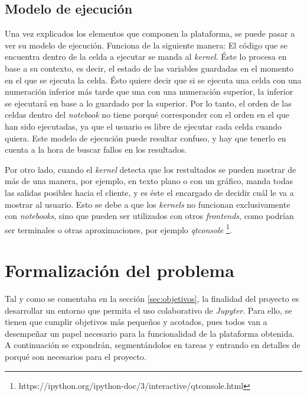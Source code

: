 \documentclass[11pt,spanish,listoffigures]{tfgetsinf}
\begin{document}
\subsection{Modelo de ejecución}
\label{subsec:modelo-ejec}

Una vez explicados los elementos que componen la plataforma, se puede pasar a ver su modelo de ejecución. Funciona de la siguiente manera: El código que se encuentra dentro de la celda a ejecutar se manda al \textit{kernel}. Éste lo procesa en base a su contexto, es decir, el estado de las variables guardadas en el momento en el que se ejecuta la celda. Ésto quiere decir que si se ejecuta una celda con una numeración inferior más tarde que una con una numeración superior, la inferior se ejecutará en base a lo guardado por la superior. Por lo tanto, el orden de las celdas dentro del \textit{notebook} no tiene porqué corresponder con el orden en el que han sido ejecutadas, ya que el usuario es libre de ejecutar cada celda cuando quiera. Este modelo de ejecución puede resultar confuso, y hay que tenerlo en cuenta a la hora de buscar fallos en los resultados.

Por otro lado, cuando el \textit{kernel} detecta que los restultados se pueden mostrar de más de una manera, por ejemplo, en texto plano o con un gráfico, manda todas las salidas posibles hacia el cliente, y es éste el encargado de decidir cuál le va a mostrar al usuario. Esto se debe a que los \textit{kernels} no funcionan exclusivamente con \textit{notebooks}, sino que pueden ser utilizados con otros \textit{frontends}, como podrían ser terminales o otras aproximaciones, por ejemplo \textit{qtconsole} \footnote{https://ipython.org/ipython-doc/3/interactive/qtconsole.html}.



\section{Formalización del problema}
\label{sec:formalizacion}

Tal y como se comentaba en la sección \ref{sec:objetivos}, la finalidad del proyecto es desarrollar un entorno que permita el uso colaborativo de \textit{Jupyter}. Para ello, se tienen que cumplir objetivos más pequeños y acotados, pues todos van a desempeñar un papel necesario para la funcionalidad de la plataforma obtenida. A continuación se expondrán, segmentándolos en tareas y entrando en detalles de porqué son necesarios para el proyecto.
\end{document}
